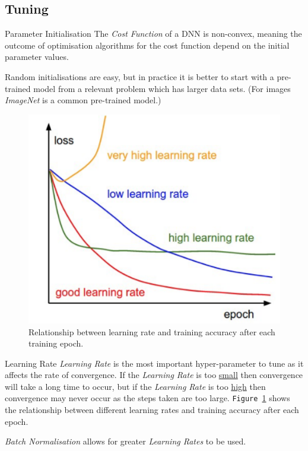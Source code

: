 \documentclass[11pt,a4paper]{article}
\begin{document}
\subsection{Tuning} \label{sec_Tuning}

  \begin{remark}{Parameter Initialisation}
    The \textit{Cost Function} of a DNN is non-convex, meaning the outcome of optimisation algorithms for the cost function depend on the initial parameter values.
    \par Random initialisations are easy, but in practice it is better to start with a pre-trained model from a relevant problem which has larger data sets. (For images \textit{ImageNet} is a common pre-trained model.)
  \end{remark}

  \begin{figure}[H]
    \begin{center}
      \includegraphics[width=.35\textwidth]{DifferentLearningRates.PNG}
    \end{center}
    \caption{ Relationship between learning rate and training accuracy after each training epoch. }
    \label{fig_Different_LRs}
  \end{figure}

  \begin{proposition}{Learning Rate}
    \textit{Learning Rate} is the most important hyper-parameter to tune as it affects the rate of convergence. If the \textit{Learning Rate} is too \underline{small} then convergence will take a long time to occur, but if the \textit{Learning Rate} is too \underline{high} then convergence may never occur as the steps taken are too large. \texttt{Figure \ref{fig_Different_LRs}} shows the relationship between different learning rates and training accuracy after each epoch.
    \par \textit{Batch Normalisation} allows for greater \textit{Learning Rates} to be used.
  \end{proposition}
\end{document}
